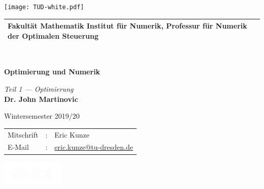 \documentclass[ngerman, a4paper, 11pt]{report}
\institute{Numerik}
\begin{document}
	\begin{titlepage}
		\pagecolor{cddarkblue!90}%
		\color{white}%
		
		\raggedright%
		\fosfamily%
		\setlength{\parindent}{0pt}%
		
		
		\hspace{-18.6mm}
		\texttt{[image: TUD-white.pdf]}%
		\vspace{3mm} 
		\begin{tabular}{m{\textwidth}}
			\hline
			\hspace{-4pt}\small{\textbf{Fakultät Mathematik} Institut für Numerik, Professur für Numerik der Optimalen Steuerung} \\
			\hline
		\end{tabular} \\
		
		\vspace{5cm}
		{\Huge\bfseries \MakeUppercase Optimierung und Numerik \par}
		\vspace{0.5cm}%
		{\Large \itshape Teil 1 --- Optimierung} \\%
		
		\vspace{1.5cm}
		\textbf{{\Large Dr. John Martinovic}} \par
		\vspace{0.5cm}
		{\large Wintersemester 2019/20}
		
		
		
		\vfill
		\begin{minipage}{\dimexpr0.75\linewidth-\fboxrule-\fboxsep}
			\begin{tabular}{lll}
				Mitschrift  & : & Eric Kunze \\
				E-Mail      & : & \href{mailto:eric.kunze@tu-dresden.de}{eric.kunze@tu-dresden.de} \\
			\end{tabular}
		\end{minipage}
		\begin{minipage}{\dimexpr0.25\linewidth-\fboxrule-\fboxsep}
			\flushright
			\href{https://github.com/oakoneric/skript-optimierung1}{%
				\includegraphics[width=8em]{img/GitHub-Logo-White.png}%
			}
		\end{minipage}
	\end{titlepage}
	\nopagecolor
	
\end{document}
